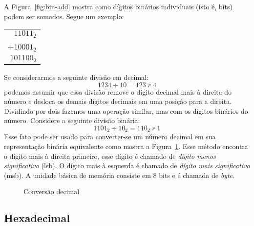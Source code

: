 A Figura~\ref{fig:bin-add} mostra como dígitos binários individuais (isto é, 
bits) podem ser somados. Segue um exemplo:

\begin{tabular}{r}
 $11011_2$ \\
+$10001_2$ \\
\hline
$101100_2$ \\
\end{tabular}

Se considerarmos a seguinte divisão em decimal:
\[ 1234 \div 10 = 123\; r\; 4 \]
podemos assumir que essa divisão remove o dígito decimal mais à direita do 
número e desloca os demais dígitos decimais em uma posição para a direita. 
Dividindo por dois fazemos uma operação similar, mas com os dígitos binários do 
número. Considere a seguinte divisão binária:
\[ 1101_2 \div 10_2 = 110_2\; r\; 1 \]
Esse fato pode ser usado para converter-se um número decimal em sua 
representação binária equivalente como mostra a Figura~\ref{fig:dec-convert}. 
Esse método encontra o dígito mais à direita primeiro, esse dígito é chamado de 
\emph{dígito menos significativo} (lsb). O dígito mais à esquerda é chamado de 
\emph{dígito mais significativo} (msb). A unidade básica de memória consiste em 
8 bits e é chamada de \emph{byte}.

\begin{figure}[t]
\centering
{}
\caption{Conversão decimal \label{fig:dec-convert}}
\end{figure}

\subsection{Hexadecimal}

